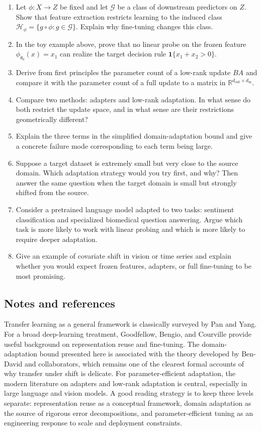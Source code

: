 \begin{enumerate}
    \item Let $\phi : X \to Z$ be fixed and let $\mathcal{G}$ be a class of downstream predictors on $Z$.
    Show that feature extraction restricts learning to the induced class $\mathcal{H}_{\phi} = \{g \circ \phi : g \in \mathcal{G}\}$.
    Explain why fine-tuning changes this class.
    \item In the toy example above, prove that no linear probe on the frozen feature $\phi_{\theta_0}(x)=x_1$ can realize the target decision rule $\mathbf{1}\{x_1+x_2>0\}$.
    \item Derive from first principles the parameter count of a low-rank update $BA$ and compare it with the parameter count of a full update to a matrix in $\mathbb{R}^{d_{\mathrm{out}} \times d_{\mathrm{in}}}$.
    \item Compare two methods: adapters and low-rank adaptation.
    In what sense do both restrict the update space, and in what sense are their restrictions geometrically different?
    \item Explain the three terms in the simplified domain-adaptation bound and give a concrete failure mode corresponding to each term being large.
    \item Suppose a target dataset is extremely small but very close to the source domain.
    Which adaptation strategy would you try first, and why?
    Then answer the same question when the target domain is small but strongly shifted from the source.
    \item Consider a pretrained language model adapted to two tasks: sentiment classification and specialized biomedical question answering.
    Argue which task is more likely to work with linear probing and which is more likely to require deeper adaptation.
    \item Give an example of covariate shift in vision or time series and explain whether you would expect frozen features, adapters, or full fine-tuning to be most promising.
\end{enumerate}

\subsection*{Notes and references}

Transfer learning as a general framework is classically surveyed by Pan and Yang.
For a broad deep-learning treatment, Goodfellow, Bengio, and Courville provide useful background on representation reuse and fine-tuning.
The domain-adaptation bound presented here is associated with the theory developed by Ben-David and collaborators, which remains one of the clearest formal accounts of why transfer under shift is delicate.
For parameter-efficient adaptation, the modern literature on adapters and low-rank adaptation is central, especially in large language and vision models.
A good reading strategy is to keep three levels separate:
representation reuse as a conceptual framework, domain adaptation as the source of rigorous error decompositions, and parameter-efficient tuning as an engineering response to scale and deployment constraints.

